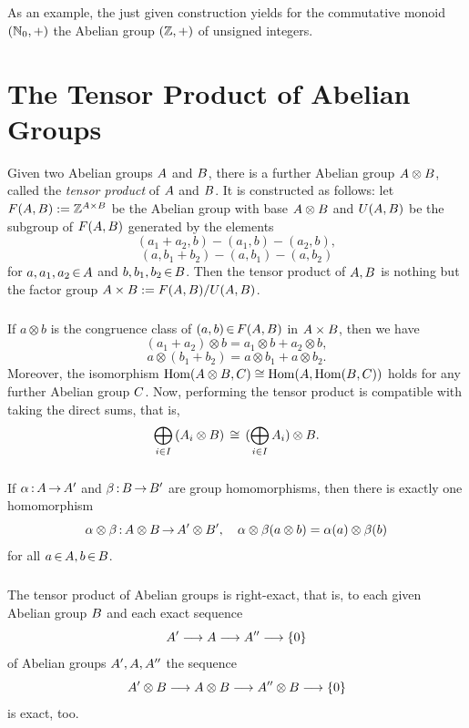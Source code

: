 \documentclass[11pt,twoside]{article}
\begin{document}
\subparagraph{}
As an example,
the just given construction yields for the commutative monoid $({\mathbb{N}}_0,+)$
the Abelian group $({\mathbb{Z}},+)$ of unsigned integers.

\section{The Tensor Product of Abelian Groups}
Given two Abelian groups $A$ and $B$,
there is a further Abelian group $A \otimes B$,
called the \textit{tensor product} of $A$ and $B$.
It is constructed as follows:
let $F(A,B) := {\mathbb{Z}}^{A \times B}$ be the Abelian group
with base $A \otimes B$
and $U(A,B)$ be the subgroup of $F(A,B)$
generated by the elements
\[
(a_1 + a_2,b) - (a_1,b) - (a_2,b),
\]
\[
(a,b_1 + b_2) - (a,b_1) - (a,b_2)
\]
for $a,a_1,a_2 {\,\in\,} A$ and $b,b_1,b_2 {\,\in\,} B$.
Then the tensor product of $A,B$
is nothing but the factor group
$A \times B := F(A,B) / U(A,B)$.

\subparagraph{}
If $a \otimes b$ is the congruence class of $(a,b) {\,\in\,} F(A,B)$
in $A \times B$,
then we have
\[
(a_1 + a_2) \otimes b = a_1 \otimes b + a_2 \otimes b,
\]
\[
a \otimes (b_1 + b_2) = a \otimes b_1 + a \otimes b_2.
\]
Moreover,
the isomorphism
$\operatorname{Hom}(A \otimes B,C) \cong \operatorname{Hom}(A, \operatorname{Hom}(B,C))$
holds for any further Abelian group $C$.
Now,
performing the tensor product is compatible with taking the direct sums,
that is,
\[
\bigoplus_{i \in I} \, (A_i \otimes B)
\, \cong \,
(\bigoplus_{i \in I} A_i) \otimes B.
\]

\subparagraph{}
If $\alpha {\,:\,} A {\,\to\,} A'$ and
   $\beta  {\,:\,} B {\,\to\,} B'$
are group homomorphisms,
then there is exactly one homomorphism
\[
\alpha \otimes \beta{\,:\,} A \otimes B {\,\to\,} A' \otimes B',
\quad
\alpha \otimes \beta (a \otimes b) = \alpha(a) \otimes \beta(b)
\]
for all $a {\,\in\,} A, b {\,\in\,} B$.

\subparagraph{}
The tensor product of Abelian groups is right-exact,
that is,
to each given Abelian group $B$ and each exact sequence
\[
A' \longrightarrow A \longrightarrow A'' \longrightarrow \{0\}
\]
of Abelian groups $A',A,A''$ the sequence
\[
A' \otimes B
\longrightarrow
A \otimes B
\longrightarrow
A'' \otimes B
\longrightarrow
\{0\}
\]
is exact, too.
\end{document}
